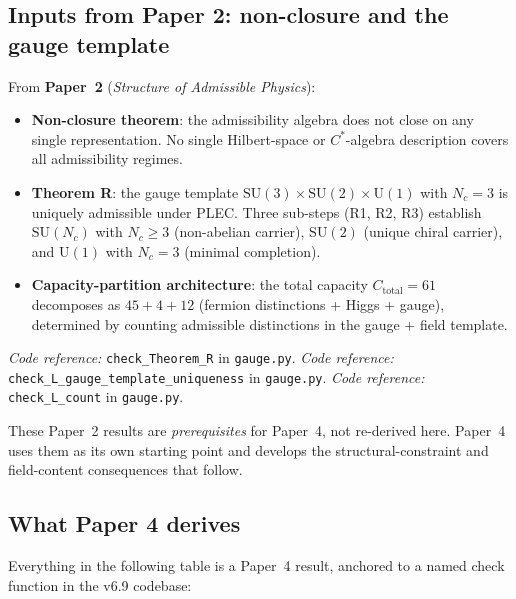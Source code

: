 \documentclass[11pt]{article}
\newcommand{\coderef}[2]{\smallskip\noindent\textit{Code reference:} \texttt{#1} in \texttt{#2}.}
\newcommand{\SU}{\mathrm{SU}}
\newcommand{\Un}{\mathrm{U}}
\newcommand{\paperref}[2]{\textbf{Paper~#1} (\textit{#2})}
\theoremstyle{definition}
\begin{document}
\subsection{Inputs from Paper 2: non-closure and the gauge template}\label{sec:inputs_paper2}

From \paperref{2}{Structure of Admissible Physics}:

\begin{itemize}
    \item \textbf{Non-closure theorem}: the admissibility algebra does not close on any single representation. No single Hilbert-space or $C^*$-algebra description covers all admissibility regimes.
    \item \textbf{Theorem R}: the gauge template $\SU(3) \times \SU(2) \times \Un(1)$ with $N_c = 3$ is uniquely admissible under PLEC. Three sub-steps (R1, R2, R3) establish $\SU(N_c)$ with $N_c \geq 3$ (non-abelian carrier), $\SU(2)$ (unique chiral carrier), and $\Un(1)$ with $N_c = 3$ (minimal completion).
    \item \textbf{Capacity-partition architecture}: the total capacity $C_{\mathrm{total}} = 61$ decomposes as $45 + 4 + 12$ (fermion distinctions + Higgs + gauge), determined by counting admissible distinctions in the gauge + field template.
\end{itemize}
\coderef{check\_Theorem\_R}{gauge.py}
\coderef{check\_L\_gauge\_template\_uniqueness}{gauge.py}
\coderef{check\_L\_count}{gauge.py}

These Paper~2 results are \emph{prerequisites} for Paper~4, not re-derived here. Paper~4 uses them as its own starting point and develops the structural-constraint and field-content consequences that follow.

\subsection{What Paper 4 derives}\label{sec:inputs_paper4_derives}

Everything in the following table is a Paper~4 result, anchored to a named check function in the v6.9 codebase:
\end{document}
